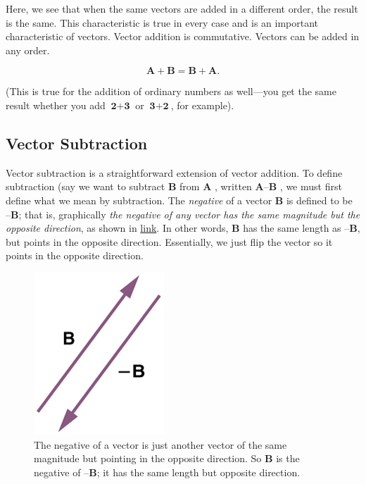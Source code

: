 \documentclass[
]{book}
\begin{document}
Here, we see that when the same vectors are added in a different order,
the result is the same. This characteristic is true in every case and is
an important characteristic of vectors. Vector addition is
{commutative}. Vectors can be added in any order.

\leavevmode{}%
\[{\textbf{A} + \textbf{B} = \textbf{B} + \textbf{A}}{}\text{.}\]

(This is true for the addition of ordinary numbers as well---you get the
same result whether you add \({\textbf{2} + \textbf{3}}{}\) or
\({\textbf{3} + \textbf{2}}{}\), for example).

\hypertarget{fs-id1165298779158}{}
\hypertarget{vector-subtraction}{%
\subsection{Vector Subtraction}\label{vector-subtraction}}

Vector subtraction is a straightforward extension of vector addition. To
define subtraction (say we want to subtract \(\textbf{B}\) from
\(\textbf{A}\) , written \(\textbf{A}–\textbf{B}\) , we must first define
what we mean by subtraction. The \emph{negative} of a vector \(\textbf{B}{}\)
is defined to be \(\textbf{–B}\); that is, graphically \emph{the negative of
any vector has the same magnitude but the opposite direction}, as shown
in \protect\hyperlink{import-auto-id1165298692950}{link}. In
other words, \(\textbf{B}{}\) has the same length as \(\textbf{–B}{}\), but
points in the opposite direction. Essentially, we just flip the vector
so it points in the opposite direction.

\begin{figure}
\hypertarget{import-auto-id1165298692950}{%
\centering
\includegraphics{images/Figure_03_02_13a.jpg}
\caption{The negative of a vector is just another vector of the same magnitude
but pointing in the opposite direction. So \(\textbf{B}{}\) is the
negative of \(\textbf{–B}{}\); it has the same length but opposite
direction.}\label{import-auto-id1165298692950}
}
\end{figure}
\end{document}
